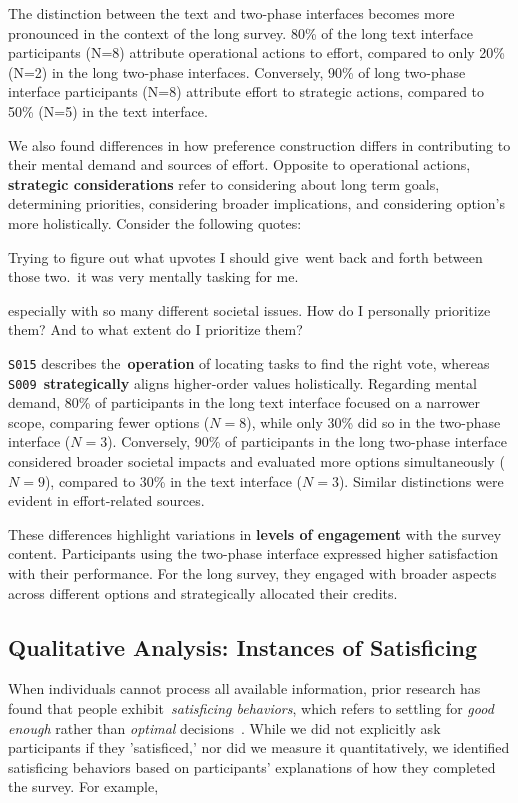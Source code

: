 The distinction between the text and two-phase interfaces becomes more pronounced in the context of the long survey. 80\% of the long text interface participants (N=8) attribute operational actions to effort, compared to only 20\% (N=2) in the long two-phase interfaces. Conversely, 90\% of long two-phase interface participants (N=8) attribute effort to strategic actions, compared to 50\% (N=5) in the text interface. 

We also found differences in how preference construction differs in contributing to their mental demand and sources of effort. Opposite to operational actions, \textbf{strategic considerations} refer to considering about long term goals, determining priorities, considering broader implications, and considering option's more holistically. Consider the following quotes:

\begin{displayquote}
Trying to figure out what upvotes I should give~\bracketellipsis went back and forth between those two.~\bracketellipsis it was very mentally tasking for me. \hfill {}
\end{displayquote}

\begin{displayquote}
\bracketellipsis especially with so many different societal issues. How do I personally prioritize them? And to what extent do I prioritize them? \hfill {}
\end{displayquote}

\texttt{S015} describes the~\textbf{operation} of locating tasks to find the right vote, whereas \texttt{S009}~\textbf{strategically} aligns higher-order values holistically. Regarding mental demand, 80\% of participants in the long text interface focused on a narrower scope, comparing fewer options ($N=8$), while only 30\% did so in the two-phase interface ($N=3$). Conversely, 90\% of participants in the long two-phase interface considered broader societal impacts and evaluated more options simultaneously ($N=9$), compared to 30\% in the text interface ($N=3$). Similar distinctions were evident in effort-related sources.

These differences highlight variations in \textbf{levels of engagement} with the survey content. Participants using the two-phase interface expressed higher satisfaction with their performance. For the long survey, they engaged with broader aspects across different options and strategically allocated their credits.

\subsection{Qualitative Analysis: Instances of Satisficing}
\label{sec:satisficing}
When individuals cannot process all available information, prior research has found that people exhibit~\textit{satisficing behaviors}, which refers to settling for \textit{good enough} rather than \textit{optimal} decisions~\cite{gigerenzerReasoningFastFrugal1996}. While we did not explicitly ask participants if they 'satisficed,' nor did we measure it quantitatively, we identified satisficing behaviors based on participants' explanations of how they completed the survey. For example, 


